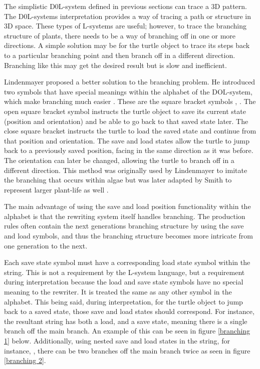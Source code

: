 The simplistic D0L-system defined in previous sections can trace a 3D pattern. The D0L-systems interpretation provides a way of tracing a path or structure in 3D space. These types of L-systems are useful; however, to trace the branching structure of plants, there needs to be a way of branching off in one or more directions. A simple solution may be for the turtle object to trace its steps back to a particular branching point and then branch off in a different direction. Branching like this may get the desired result but is slow and inefficient. 

Lindenmayer proposed a better solution to the branching problem. He introduced two symbols that have special meanings within the alphabet of the DOL-system, which make branching much easier \cite{lindenmayer1968mathematical}. These are the square bracket symbols \say{[}, \say{]}. The open square bracket \say{[} symbol instructs the turtle object to save its current state (position and orientation) and be able to go back to that saved state later. The close square bracket \say{]} instructs the turtle to load the saved state and continue from that position and orientation. The save and load states allow the turtle to jump back to a previously saved position, facing in the same direction as it was before. The orientation can later be changed, allowing the turtle to branch off in a different direction. This method was originally used by Lindenmayer to imitate the branching that occurs within algae but was later adapted by Smith to represent larger plant-life as well \cite{smith1984plants}.
 
The main advantage of using the save and load position functionality within the alphabet is that the rewriting system itself handles branching. The production rules often contain the next generations branching structure by using the save and load symbols, and thus the branching structure becomes more intricate from one generation to the next.

Each save state symbol must have a corresponding load state symbol within the string. This is not a requirement by the L-system language, but a requirement during interpretation because the load and save state symbols have no special meaning to the rewriter. It is treated the same as any other symbol in the alphabet. This being said, during interpretation, for the turtle object to jump back to a saved state, those save and load states should correspond. For instance, the resultant string  has both a load, and a save state, meaning there is a single branch off the main branch. An example of this can be seen in figure \ref{branching 1} below. Additionally, using nested save and load states in the string, for instance, , there can be two branches off the main branch twice as seen in figure \ref{branching 2}.

